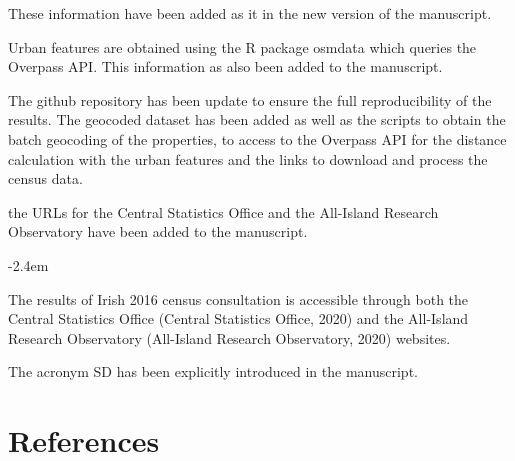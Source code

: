\documentclass[]{article}
\renewenvironment{quote}{\begin{fquote}\advance\leftmargini -2.4em\begin{oldquote}}{\end{oldquote}\end{fquote}}
\newenvironment{fquote}
  {\def\FrameCommand{
	\fboxsep=0.6em %
	\fcolorbox{black}{white}}%
    \MakeFramed {\advance\hsize-2\width \FrameRestore}
    \begin{minipage}{\linewidth}
  }
  {\end{minipage}\endMakeFramed}
\begin{document}
These information have been added as it in the new version of the manuscript.

Urban features are obtained using the R package osmdata which queries the Overpass API. This information as also been added to the manuscript.


The github repository has been update to ensure the full reproducibility of the results. The geocoded dataset has been added as well as the scripts to obtain the batch geocoding of the properties, to access to the Overpass API for the distance calculation with the urban features and the links to download and process the census data.


the URLs for the Central Statistics Office and the All-Island Research Observatory have been added to the manuscript.

\begin{quote}
The results of Irish 2016 census consultation is accessible through both the Central Statistics Office (Central Statistics Office, 2020) and the All-Island Research Observatory (All-Island Research Observatory, 2020) websites.
\end{quote}


The acronym SD has been explicitly introduced in the manuscript.

\hypertarget{references}{%
\section*{References}\label{references}}
\end{document}
